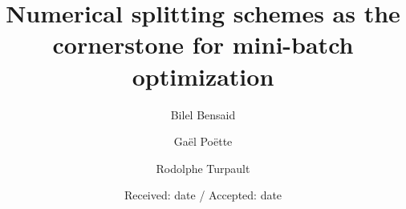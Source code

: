 \newcommand{\Frac}[2]{\displaystyle \frac{#1}{#2}\otimes }
\newcommand{\BlackBox}{\rule{1.5ex}{1.5ex}}

\newcommand{\polyTwo}{PolyGlobalMild }
\newcommand{\polyThree}{PolyLocalMild }
\newcommand{\polyFour}{PolyGlobalStiff }
\newcommand{\polyFive}{PolyAllStiff }

\newcommand{\exOne}{$"2Gen"$ }
\newcommand{\exTwo}{$"2Ego>Gen"$ }
\newcommand{\exThree}{$"2Ego<Eq<Gen"$ }
\newcommand{\exFour}{$"2Ego\ll Gen"$ }
\newcommand{\exFive}{$"3Gen"$ }
\newcommand{\exSix}{$"3Ego<2Plot\approx Gen"$ }
\newcommand{\exSeven}{$"3Ego\ll Gen"$ }
\newcommand{\exHeight}{$"4Ego<2Plot<Gen"$ }

\newcommand{\mg}{gm} %
\newcommand{\ml}{lm}
\newcommand{\ps}{sp}






\title{Numerical splitting schemes as the cornerstone for mini-batch optimization}
\subtitle{}


\author{Bilel Bensaid     \and
		Ga\"el Po\"ette   \and
        Rodolphe Turpault
}



\date{Received: date / Accepted: date}


\maketitle

